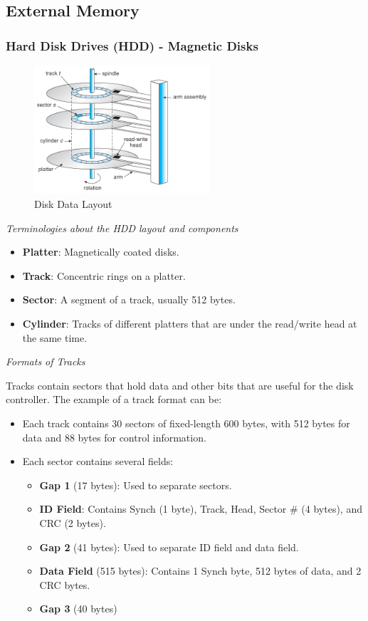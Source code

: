 \subsection{External Memory}

\subsubsection{Hard Disk Drives (HDD) - Magnetic Disks}

\begin{figure}[H]
    \centering
    \includegraphics[width=0.58\textwidth]{chaps/memory/external-memory/hdd-layout.jpg}
    \caption{Disk Data Layout}
\end{figure}

\emph{Terminologies about the HDD layout and components}
\begin{itemize}
    \item \textbf{Platter}: Magnetically coated disks.
    \item \textbf{Track}: Concentric rings on a platter.
    \item \textbf{Sector}: A segment of a track, usually 512 bytes.
    \item \textbf{Cylinder}: Tracks of different platters that are under the read/write head
        at the same time.
\end{itemize}

\emph{Formats of Tracks}

Tracks contain sectors that hold data and other bits that
are useful for the disk controller. The example of a track format can be:
\begin{itemize}
    \item Each track contains 30 sectors of fixed-length 600 bytes, with 512 bytes for data
        and 88 bytes for control information.
    \item Each sector contains several fields: \begin{itemize}
        \item \textbf{Gap 1} (17 bytes): Used to separate sectors.
        \item \textbf{ID Field}: Contains Synch (1 byte), Track, Head, Sector \# (4 bytes),
            and CRC (2 bytes).
        \item \textbf{Gap 2} (41 bytes): Used to separate ID field and data field.
        \item \textbf{Data Field} (515 bytes): Contains 1 Synch byte, 512 bytes of data, and 2
            CRC bytes.
        \item \textbf{Gap 3} (40 bytes)
    \end{itemize}
\end{itemize}

